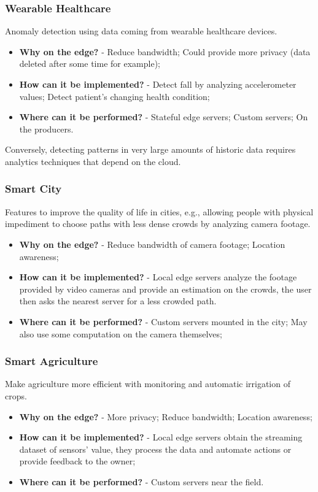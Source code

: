 \subsubsection{Wearable Healthcare}
Anomaly detection using data coming from wearable healthcare devices.
\begin{itemize}
    \item \textbf{Why on the edge?} - Reduce bandwidth; Could provide more privacy (data deleted after some time for example);
    \item \textbf{How can it be implemented?} - Detect fall by analyzing accelerometer values; Detect patient’s changing health condition;
    \item \textbf{Where can it be performed?} - Stateful edge servers; Custom servers; On the producers.
\end{itemize}
Conversely, detecting patterns in very large amounts of historic data requires analytics techniques that depend on the cloud.


\subsubsection{Smart City}
Features to improve the quality of life in cities, e.g., allowing people with physical impediment to choose paths with less dense crowds by analyzing camera footage.
\begin{itemize}
    \item \textbf{Why on the edge?} - Reduce bandwidth of camera footage; Location awareness;
    \item \textbf{How can it be implemented?} - Local edge servers analyze the footage provided by video cameras and provide an estimation on the crowds, the user then asks the nearest server for a less crowded path.
    \item \textbf{Where can it be performed?} - Custom servers mounted in the city; May also use some computation on the camera themselves;
\end{itemize}


\subsubsection{Smart Agriculture}
Make agriculture more efficient with monitoring and automatic irrigation of crops.
\begin{itemize}
    \item \textbf{Why on the edge?} - More privacy; Reduce bandwidth; Location awareness;
    \item \textbf{How can it be implemented?} - Local edge servers obtain the streaming dataset of sensors’ value, they process the data and automate actions or provide feedback to the owner;
    \item \textbf{Where can it be performed?} - Custom servers near the field.
\end{itemize}


